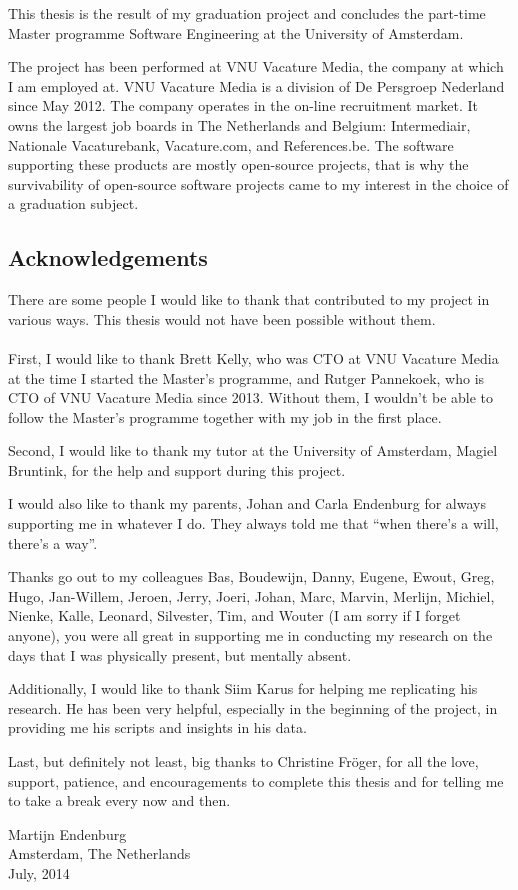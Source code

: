This thesis is the result of my graduation project and concludes the part-time
Master programme Software Engineering at the University of Amsterdam.

The project has been performed at VNU Vacature Media, the company at which I am
employed at. VNU Vacature Media is a division of De Persgroep Nederland since
May 2012. The company operates in the on-line recruitment market. It owns the
largest job boards in The Netherlands and Belgium: Intermediair,
Nationale Vacaturebank, Vacature.com, and References.be. The software
supporting these products are mostly open-source projects, that is why the
survivability of open-source software projects came to my interest in the choice
of a graduation subject.

\subsection*{Acknowledgements}
There are some people I would like to thank that contributed to my project
in various ways. This thesis would not have been possible without them.

\paragraph{}
First, I would like to thank Brett Kelly, who was CTO at VNU Vacature Media at
the time I started the Master's programme, and Rutger Pannekoek, who is CTO of
VNU Vacature Media since 2013. Without them, I wouldn't be able to follow the
Master's programme together with my job in the first place.

Second, I would like to thank my tutor at the University of Amsterdam, Magiel
Bruntink, for the help and support during this project.

I would also like to thank my parents, Johan and Carla Endenburg for always
supporting me in whatever I do. They always told me that ``when there's a will,
there's a way''.

Thanks go out to my colleagues
Bas,
Boudewijn,
Danny,
Eugene,
Ewout,
Greg,
Hugo,
Jan-Willem,
Jeroen,
Jerry,
Joeri,
Johan,
Marc,
Marvin,
Merlijn,
Michiel,
Nienke,
Kalle,
Leonard,
Silvester,
Tim,
and Wouter
(I am sorry if I forget anyone), you were all great in supporting me in
conducting my research on the days that I was physically present, but mentally
absent.

Additionally, I would like to thank Siim Karus for helping me replicating his
research. He has been very helpful, especially in the beginning of the project,
in providing me his scripts and insights in his data.

Last, but definitely not least, big thanks to Christine Fr\"{o}ger, for all the
love, support, patience, and encouragements to complete this thesis and for
telling me to take a break every now and then.\\[2em]

\begin{flushright}
Martijn Endenburg\\
Amsterdam, The Netherlands\\
July, 2014
\end{flushright}
